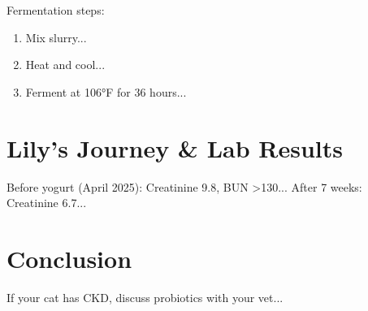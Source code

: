\documentclass[twocolumn]{NobArticle}
\begin{document}
	Fermentation steps:
	\begin{enumerate}[leftmargin=*]
		\item Mix slurry...
		\item Heat and cool...
		\item Ferment at 106°F for 36 hours...
	\end{enumerate}
	
	\section{Lily's Journey \& Lab Results}
	Before yogurt (April 2025): Creatinine 9.8, BUN >130...  
	After 7 weeks: Creatinine 6.7...
	
	\section{Conclusion}
	If your cat has CKD, discuss probiotics with your vet...
	
	\printbibliography
	
\end{document}
